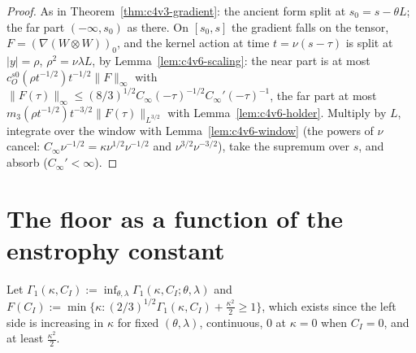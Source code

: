 \documentclass[11pt]{article}
\theoremstyle{plain}
\theoremstyle{definition}
\theoremstyle{remark}
\begin{document}
\begin{proof}
As in Theorem~\ref{thm:c4v3-gradient}: the ancient form split at
\(s_0=s-\theta L\); the far part \((-\infty,s_0)\) as there.  On \([s_0,s]\) the gradient
falls on the tensor, \(F=(\nabla(W\otimes W))_0\), and the kernel action at time
\(t=\nu(s-\tau)\) is split at \(|y|=\rho\), \(\rho^2=\nu\lambda L\), by Lemma~\ref{lem:c4v6-scaling}:
the near part is at most \(c_O^{s0}(\rho t^{-1/2})t^{-1/2}\|F\|_\infty\) with
\(\|F(\tau)\|_\infty\le(8/3)^{1/2}C_\infty(-\tau)^{-1/2}C_\infty'(-\tau)^{-1}\), the far part at most
\(m_3(\rho t^{-1/2})t^{-3/2}\|F(\tau)\|_{L^{3/2}}\) with Lemma~\ref{lem:c4v6-holder}.  Multiply by
\(L\), integrate over the window with Lemma~\ref{lem:c4v6-window} (the
powers of \(\nu\) cancel: \(C_\infty\nu^{-1/2}=\kappa\nu^{1/2}\nu^{-1/2}\) and \(\nu^{3/2}\nu^{-3/2}\)), take the
supremum over \(s\), and absorb (\(C_\infty'<\infty\)).
\end{proof}

\section{The floor as a function of the enstrophy constant}
\label{sec:c4v7-floor}

Let \(\Gamma_1(\kappa,C_I):=\inf_{\theta,\lambda}\Gamma_1(\kappa,C_I;\theta,\lambda)\) and
\(F(C_I):=\min\{\kappa:(2/3)^{1/2}\Gamma_1(\kappa,C_I)+\frac{\kappa^2}2\ge1\}\), which exists since the left side
is increasing in \(\kappa\) for fixed \((\theta,\lambda)\), continuous, \(0\) at \(\kappa=0\) when \(C_I=0\),
and at least \(\frac{\kappa^2}2\).
\end{document}
